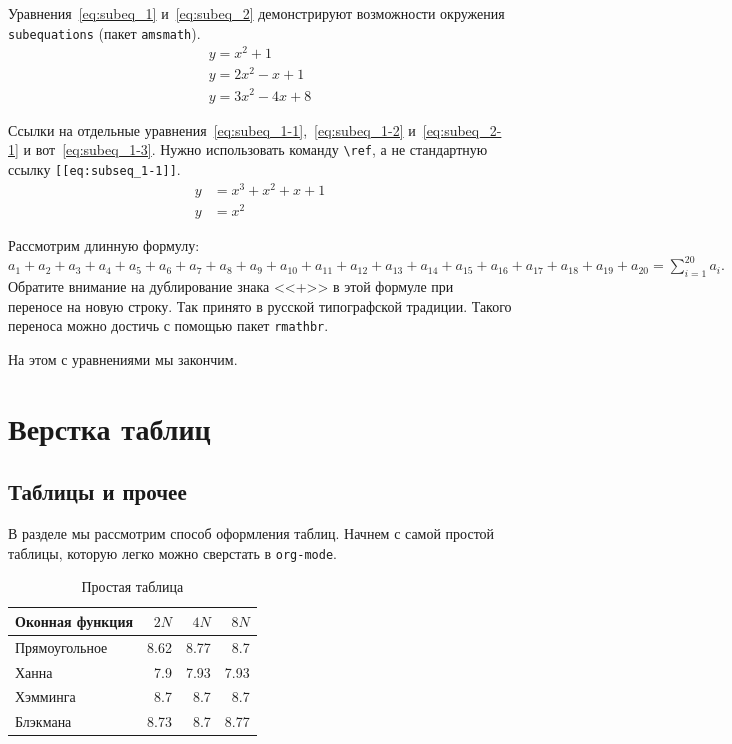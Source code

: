 \documentclass[12pt]{extarticle}
\begin{document}
Уравнения~\eqref{eq:subeq_1} и~\eqref{eq:subeq_2} демонстрируют возможности окружения \texttt{subequations} (пакет \texttt{amsmath}).
\begin{subequations}
\label{eq:subeq_1}
\begin{gather}
        y = x^2 + 1\label{eq:subeq_1-1} \\
        y = 2 x^2 - x + 1\label{eq:subeq_1-2} \\
        y = 3 x^2 - 4x + 8\label{eq:subeq_1-3}
    \end{gather}
\end{subequations}

Ссылки на отдельные уравнения~\ref{eq:subeq_1-1},~\ref{eq:subeq_1-2} и~\ref{eq:subeq_2-1} и вот~\ref{eq:subeq_1-3}.
Нужно использовать команду \texttt{\textbackslash{}ref}, а не стандартную ссылку \texttt{[[eq:subseq\_1-1]]}.
\begin{subequations}
\label{eq:subeq_2}
\begin{align}
        y & = x^3 + x^2 + x + 1\label{eq:subeq_2-1} \\
        y & = x^2
    \end{align}
\end{subequations}

Рассмотрим длинную формулу:
\(a_1+a_2+a_3+a_4+a_5+a_6+a_7+a_8+a_{9}+a_{10}+a_{11}+a_{12}+a_{13}+a_{14}+a_{15}+a_{16}+a_{17}+a_{18}+a_{19}+a_{20}=\sum_{i=1}^{20}a_{i}.\)
Обратите внимание на дублирование знака {}<<+>>{} в этой формуле при переносе на новую строку.
Так принято в русской типографской традиции.
Такого переноса можно достичь с помощью пакет \texttt{rmathbr}.

На этом с уравнениями мы закончим.
\section{Верстка таблиц}
\label{sec:org49f1cfb}
\subsection{Таблицы и прочее}
\label{sec:orgb3cb486}
В разделе мы рассмотрим способ оформления таблиц.
Начнем с самой простой таблицы, которую легко можно сверстать в \texttt{org-mode}.
\begin{table}[htbp]
\caption{\label{tab:table1}Простая таблица}
\centering
\begin{tabular}{lrrr}
\hline
Оконная функция & \(2N\) & \(4N\) & \(8N\)\\
\hline
Прямоугольное & 8.62 & 8.77 & 8.7\\
\hline
Ханна & 7.9 & 7.93 & 7.93\\
\hline
Хэмминга & 8.7 & 8.7 & 8.7\\
\hline
Блэкмана & 8.73 & 8.7 & 8.77\\
\hline
\end{tabular}
\end{table}
\end{document}
